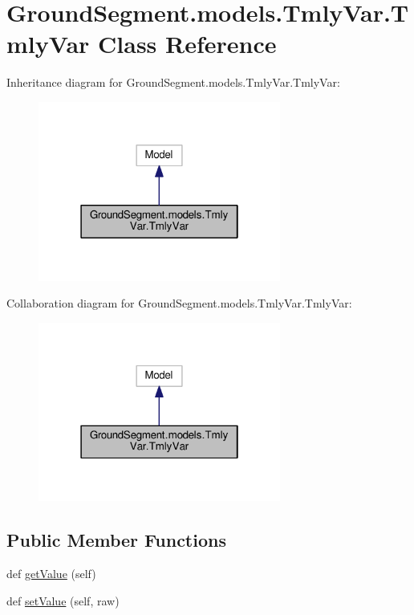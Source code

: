 \hypertarget{class_ground_segment_1_1models_1_1_tmly_var_1_1_tmly_var}{}\section{Ground\+Segment.\+models.\+Tmly\+Var.\+Tmly\+Var Class Reference}
\label{class_ground_segment_1_1models_1_1_tmly_var_1_1_tmly_var}


Inheritance diagram for Ground\+Segment.\+models.\+Tmly\+Var.\+Tmly\+Var\+:\nopagebreak
\begin{figure}[H]
\begin{center}
\leavevmode
\includegraphics[width=226pt]{class_ground_segment_1_1models_1_1_tmly_var_1_1_tmly_var__inherit__graph}
\end{center}
\end{figure}


Collaboration diagram for Ground\+Segment.\+models.\+Tmly\+Var.\+Tmly\+Var\+:\nopagebreak
\begin{figure}[H]
\begin{center}
\leavevmode
\includegraphics[width=226pt]{class_ground_segment_1_1models_1_1_tmly_var_1_1_tmly_var__coll__graph}
\end{center}
\end{figure}
\subsection*{Public Member Functions}
\begin{DoxyCompactItemize}
\item 
def \hyperlink{class_ground_segment_1_1models_1_1_tmly_var_1_1_tmly_var_a1362e4d2da768ea8415d93ef8a355735}{get\+Value} (self)
\item 
def \hyperlink{class_ground_segment_1_1models_1_1_tmly_var_1_1_tmly_var_af46e07b1dea3c04a0b165c93067139a7}{set\+Value} (self, raw)
\end{DoxyCompactItemize}
